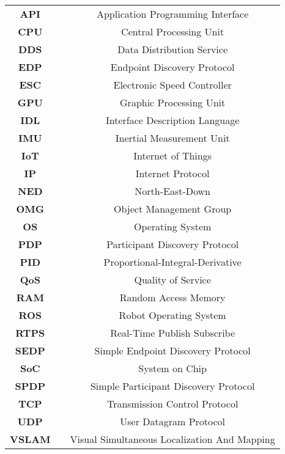 \begin{center}
\begin{tabular}{ c c c }
\textbf{API}   & & Application Programming Interface\\
\textbf{CPU}   & & Central Processing Unit\\
\textbf{DDS}   & & Data Distribution Service\\
\textbf{EDP}   & & Endpoint Discovery Protocol\\
\textbf{ESC}   & & Electronic Speed Controller\\
\textbf{GPU}   & & Graphic Processing Unit\\
\textbf{IDL}   & & Interface Description Language\\
\textbf{IMU}   & & Inertial Measurement Unit\\
\textbf{IoT}   & & Internet of Things\\
\textbf{IP}    & & Internet Protocol\\
\textbf{NED}   & & North-East-Down\\
\textbf{OMG}   & & Object Management Group\\
\textbf{OS}    & & Operating System\\
\textbf{PDP}   & & Participant Discovery Protocol\\
\textbf{PID}   & & Proportional-Integral-Derivative\\
\textbf{QoS}   & & Quality of Service\\
\textbf{RAM}   & & Random Access Memory\\
\textbf{ROS}   & & Robot Operating System\\
\textbf{RTPS}  & & Real-Time Publish Subscribe\\
\textbf{SEDP}  & & Simple Endpoint Discovery Protocol\\
\textbf{SoC}   & & System on Chip\\
\textbf{SPDP}  & & Simple Participant Discovery Protocol\\
\textbf{TCP}   & & Transmission Control Protocol\\
\textbf{UDP}   & & User Datagram Protocol\\
\textbf{VSLAM} & & Visual Simultaneous Localization And Mapping\\

\end{tabular}
\end{center}

\restoregeometry
